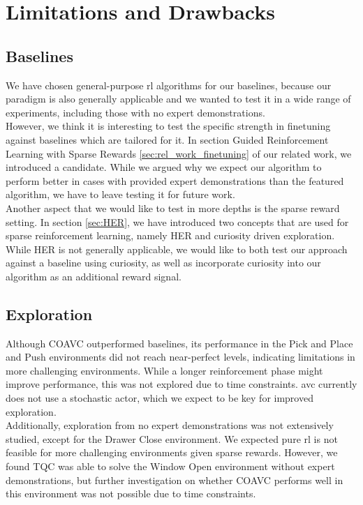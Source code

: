 \section{Limitations and Drawbacks}
\subsection{Baselines}
We have chosen general-purpose \ac{rl} algorithms for our baselines, because our paradigm is also generally applicable 
and we wanted to test it in a wide range of experiments, including those with no expert demonstrations.\\ 

However, we think it is interesting to test the specific strength in finetuning against baselines which are 
tailored for it. In section Guided Reinforcement Learning with Sparse Rewards \ref{sec:rel_work_finetuning} of our related work, we introduced 
a candidate. While we argued why we expect our algorithm to perform better in cases with provided expert demonstrations than the featured algorithm, we have to 
leave testing it for future work.\\

Another aspect that we would like to test in more depths is the sparse reward setting. In section \ref{sec:HER}, we have introduced two concepts that are used for sparse reinforcement learning, namely 
HER and curiosity driven exploration. While HER is not generally applicable, we would like to both test our approach against a baseline using curiosity, as well as incorporate 
curiosity into our algorithm as an additional reward signal. 

\subsection{Exploration}
Although COAVC outperformed baselines, its performance in the Pick and Place and Push environments did not reach near-perfect levels, 
indicating limitations in more challenging environments. While a longer reinforcement phase might improve performance, this was not explored 
due to time constraints. \ac{avc} currently does not use a stochastic actor, which we expect to be key for improved exploration.\\ 

Additionally, exploration from no expert demonstrations was not extensively studied, except for the Drawer Close 
environment. We expected pure \ac{rl} is not feasible for more challenging environments given sparse rewards. 
However, we found TQC was able to solve the Window Open environment without expert demonstrations, but further investigation on whether 
COAVC performs well in this environment was not possible due to time constraints.\\ 

